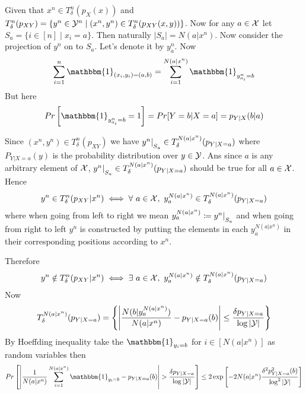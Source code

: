 \documentclass[a4paper, 11pt]{article}
\begin{document}
Given that $x^n\in T_{\delta}^n(p_{X}(x))$ and $T_{\delta}^n(p_{XY})=\{y^n\in \mathcal{Y}^n\mid (x^n,y^n)\in T_{\delta}^n(p_{XY}(x,y))\}$. Now for any $a\in \mathcal{X}$ let $S_a=\{i\in [n]\mid x_i=a\}$. Then naturally $|S_a|=N(a|x^n)$. Now consider the projection of $y^n$ on to $S_a$. Let's denote it by $y^n_{a}$. Now $$\sum\limits_{i=1}^n\mathbbm{1}_{(x_i,y_i)=(a,b)}=\sum\limits_{i=1}^{N(a|x^n)}\mathbbm{1}\st_{y^n_{a_i}=b}$$But here $$Pr\lt[\mathbbm{1}\st_{y^n_{a_i}=b}=1\rt]=Pr[Y=b|X=a]=p_{Y|X}(b|a)$$


Since $(x^n,y^n)\in T_{\delta}^n(p_{XY})$ we have $y^n|\strut_{S_a}\in T_{\delta}^{N(a|x^n)}(p_{Y|X=a})$ where $P_{Y|X=a}(y)$ is the probability distribution over $y\in \mathcal{Y}$. Ans since $a$ is any arbitrary element of $\mathcal{X}$, $y^n|\strut_{S_a}\in T_{\delta}^{N(a|x^n)}(p_{Y|X=a})$ should be true for all $a\in \mathcal{X}$. Hence $$y^n\in T_{\delta}^n(p_{XY}|x^n)\iff \forall\ a\in \mathcal{X}, \ y^{N(a|x^n)}_a\in T_{\delta}^{N(a|x^n)}(p_{Y|X=a})$$where when going from left to right we mean $y^{N(a|x^n)}_a\coloneqq y^n|\strut_{S_a}$ and when going from right to left $y^n$ is constructed by putting the elements in each $y^{N(a|x^n)}_a$ in their corresponding positions according to $x^n$.

Therefore $$y^n\notin T_{\delta}^n(p_{XY}|x^n)\iff \exists\ a\in\mathcal{X},\ y^{N(a|x^n)}_a\notin T_{\delta}^{N(a|x^n)}(p_{Y|X=a})$$
Now $$ T_{\delta}^{N(a|x^n)}(p_{Y|X=a})=\left\{ \left|\frac{N(b|y^{N(a|x^n)}_a)}{N(a|x^n)}-p_{Y|X=a}(b)\right|\leq \frac{\delta p_{Y|X=a}}{\log |\mathcal{Y}|} \right\}$$
By Hoeffding inequality take the $\mathbbm{1}_{y_i=b}$ for $i\in [N(a|x^n)]$ as random variables then 
$$Pr\lt[ \lt| \frac1{N(a|x^n)}\sum_{i=1}^{N(a|x^n)}\mathbbm{1}_{y_i=b} -p_{Y|X=a}(b)\rt|>\frac{\delta p_{Y|X=a}}{\log |\mcY|} \rt]\leq 2\exp\lt[ -2N(a|x^n)\frac{\delta^2p_{Y|X=a}^2(b)}{\log^2|\mcY|} \rt]$$

	
\end{document}

